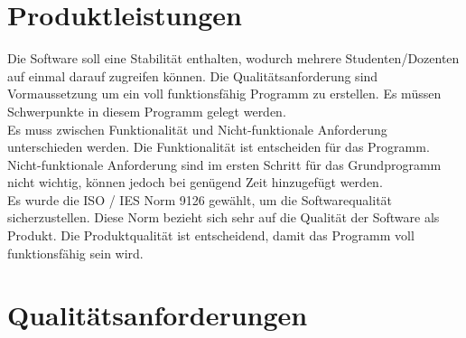 \documentclass[a4paper,listof=leveldown,listof=numbered]{scrreprt}
\begin{document}
\chapter{Produktleistungen}
	Die Software soll eine Stabilität enthalten, wodurch mehrere Studenten/Dozenten auf einmal darauf zugreifen können. Die Qualitätsanforderung sind Vormaussetzung um ein voll funktionsfähig Programm zu erstellen. Es müssen Schwerpunkte in diesem Programm gelegt werden.\\
	
	Es muss zwischen Funktionalität und Nicht-funktionale Anforderung unterschieden werden. Die Funktionalität ist entscheiden für das Programm. Nicht-funktionale Anforderung sind im ersten Schritt für das Grundprogramm nicht wichtig, können jedoch bei genügend Zeit hinzugefügt werden.\\
	
	Es wurde die ISO / IES Norm 9126 gewählt, um die Softwarequalität sicherzustellen. Diese Norm bezieht sich sehr auf die Qualität der Software als Produkt. Die Produktqualität ist entscheidend, damit das Programm voll funktionsfähig sein wird. 

	
\chapter{Qualitätsanforderungen}
		
	
\end{document}
